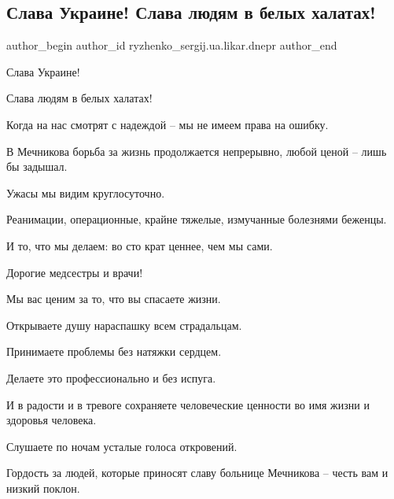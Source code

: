  
 
 
 
 
 
\subsection{Слава Украине! Слава людям в белых халатах!}
\label{sec:18_06_2022.fb.ryzhenko_sergij.ua.likar.dnepr.1.belye_halaty}
 
\ifcmt
 author_begin
   author_id ryzhenko_sergij.ua.likar.dnepr
 author_end
\fi

Слава Украине! 

Слава людям в белых халатах!

Когда на нас смотрят с надеждой – мы не имеем права на ошибку.

В Мечникова борьба за жизнь продолжается непрерывно, любой ценой – лишь бы
задышал.


Ужасы мы видим круглосуточно.

Реанимации, операционные, крайне тяжелые, измучанные болезнями беженцы.

И то, что мы делаем: во сто крат ценнее, чем мы сами.

Дорогие медсестры и врачи! 

Мы вас ценим за то, что вы спасаете жизни.

Открываете душу нараспашку всем страдальцам.

Принимаете проблемы без натяжки сердцем.

Делаете это профессионально и без испуга.

И в радости и в тревоге сохраняете человеческие ценности во имя жизни и
здоровья человека.

Слушаете по ночам усталые голоса откровений.

Гордость за людей, которые приносят славу больнице Мечникова – честь вам и
низкий поклон.

